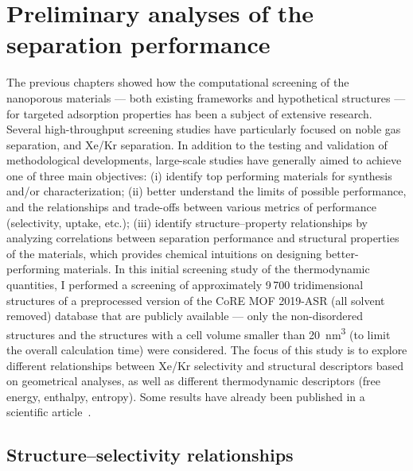 \documentclass[main.tex]{subfiles}
\begin{document}

\section{Preliminary analyses of the separation performance}

The previous chapters showed how the computational screening of the nanoporous materials --- both existing frameworks and hypothetical structures --- for targeted adsorption properties has been a subject of extensive research. Several high-throughput screening studies have particularly focused on noble gas separation, and Xe/Kr separation. In addition to the testing and validation of methodological developments, large-scale studies have generally aimed to achieve one of three main objectives: (i) identify top performing materials for synthesis and/or characterization; (ii) better understand the limits of possible performance, and the relationships and trade-offs between various metrics of performance (selectivity, uptake, etc.); (iii) identify structure--property relationships by analyzing correlations between separation performance and structural properties of the materials, which provides chemical intuitions on designing better-performing materials. In this initial screening study of the thermodynamic quantities, I performed a screening of approximately 9\,700 tridimensional structures of a preprocessed version of the CoRE MOF 2019-ASR (all solvent removed) database that are publicly available --- only the non-disordered structures and the structures with a cell volume smaller than \SI{20}{\nano\meter\cubed} (to limit the overall calculation time) were considered. The focus of this study is to explore different relationships between Xe/Kr selectivity and structural descriptors based on geometrical analyses, as well as different thermodynamic descriptors (free energy, enthalpy, entropy). Some results have already been published in a scientific article~\cite{Ren_2021}.

\subsection{Structure--selectivity relationships}\label{sct:geometry}
\end{document}
